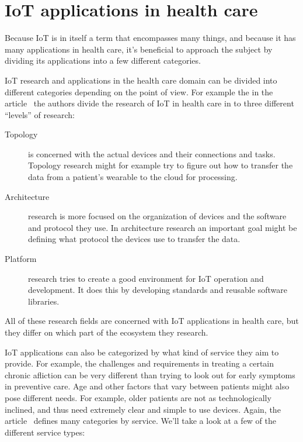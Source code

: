 \section{IoT applications in health care}
\label{sec:iot-health}

Because IoT is in itself a term that encompasses many things, and because it
has many applications in health care, it's beneficial to approach the subject
by dividing its applications into a few different categories.

IoT research and applications in the health care domain can be divided into
different categories depending on the point of view. For example the in the
article~\cite{Islam2015} the authors divide the research of IoT in health care
in to three different ``levels'' of research:

\begin{description}
  \item[Topology] is concerned with the actual devices and their connections
    and tasks. Topology research might for example try to figure out how to
    transfer the data from a patient's wearable to the cloud for processing.

  \item[Architecture] research is more focused on the organization of devices
    and the software and protocol they use. In architecture research an
    important goal might be defining what protocol the devices use to transfer
    the data.

  \item[Platform] research tries to create a good environment for IoT
    operation and development. It does this by developing standards and
    reusable software libraries.

\end{description}

All of these research fields are concerned with IoT applications in health
care, but they differ on which part of the ecosystem they research.

IoT applications can also be categorized by what kind of service they aim to
provide. For example, the challenges and requirements in treating a certain
chronic afliction can be very different than trying to look out for early
symptoms in preventive care. Age and other factors that vary between patients
might also pose different needs. For example, older patients are not as
technologically inclined, and thus need extremely clear and simple to use
devices. Again, the article~\cite{Islam2015} defines many categories by
service. We'll take a look at a few of the different service types:


